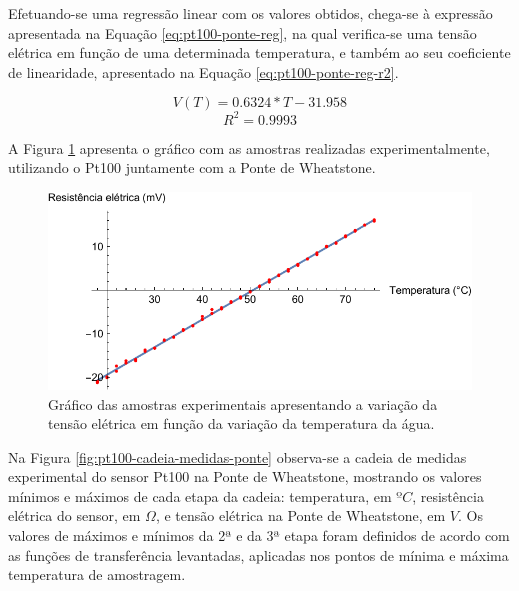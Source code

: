 \documentclass[a4paper]{instrumentacao}
\begin{document}
Efetuando-se uma regressão linear com os valores obtidos, chega-se à expressão apresentada na Equação \ref{eq:pt100-ponte-reg}, na qual verifica-se uma tensão elétrica em função de uma determinada temperatura, e também ao seu coeficiente de linearidade, apresentado na Equação \ref{eq:pt100-ponte-reg-r2}.

\begin{equation}
	V(T) = 0.6324*T - 31.958
	\label{eq:pt100-ponte-reg}
\end{equation}
\begin{equation}
	R^2=0.9993
	\label{eq:pt100-ponte-reg-r2}
\end{equation}

A Figura \ref{fig:pt100-amostras-ponte} apresenta o gráfico com as amostras realizadas experimentalmente, utilizando o Pt100 juntamente com a Ponte de Wheatstone.

\begin{figure}[H]
\center
\includegraphics[width=\textwidth]{Pt100-Experimental-Bridge.pdf}
\caption{Gráfico das amostras experimentais apresentando a variação da tensão elétrica em função da variação da temperatura da água.}
\label{fig:pt100-amostras-ponte}
\end{figure}

Na Figura \ref{fig:pt100-cadeia-medidas-ponte} observa-se a  cadeia de medidas experimental do sensor Pt100 na Ponte de Wheatstone, mostrando os valores mínimos e máximos de cada etapa da cadeia: temperatura, em $ºC$, resistência elétrica do sensor, em $\Omega$, e tensão elétrica na Ponte de Wheatstone, em $V$. Os valores de máximos e mínimos da 2ª e da 3ª etapa foram definidos de acordo com as funções de transferência levantadas, aplicadas nos pontos de mínima e máxima temperatura de amostragem.
\end{document}
